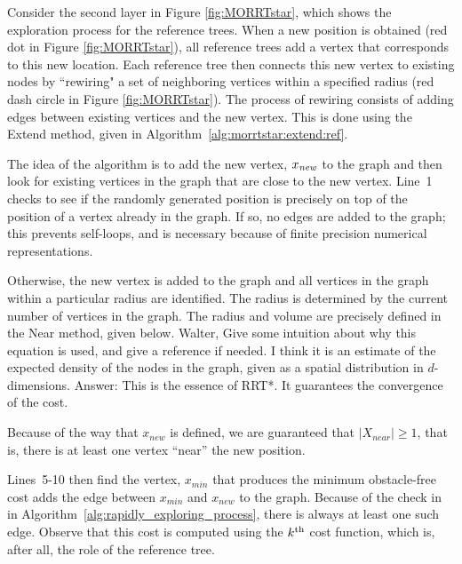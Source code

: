 \documentclass[conference]{IEEEtran}
\begin{document}

Consider the second layer in Figure \ref{fig:MORRTstar}, which shows the exploration process for the reference trees.
When a new position is obtained (red dot in Figure \ref{fig:MORRTstar}), all reference trees add a vertex that corresponds to this new location.  
Each reference tree then connects this new vertex to existing nodes by ``rewiring" a set of neighboring vertices within a specified radius (red dash circle in Figure \ref{fig:MORRTstar}).  
The process of rewiring consists of adding edges between existing vertices and the new vertex.  This is done using the {\sc Extend} method, given in Algorithm~\ref{alg:morrtstar:extend:ref}.

The idea of the algorithm is to add the new vertex, $x_{\it new}$ to the graph and then look for existing vertices in the graph that are close to the new vertex. 
Line~1 checks to see if the randomly generated position is precisely on top of the position of a vertex already in the graph.  
If so, no edges are added to the graph; this prevents self-loops, and is necessary because of finite precision numerical representations.  

Otherwise, the new vertex is added to the graph and all vertices in the graph within a particular radius are identified.  
The radius is determined by the current number of vertices in the graph. 
The radius and volume are precisely defined in the {\sc Near} method, given below. 
{\sc Walter, Give some intuition about why this equation is used, and give a reference if needed.  I think it is an estimate of the expected density of the nodes in the graph, given as a spatial distribution in $d$-dimensions.}  
{\sc Answer: This is the essence of RRT*. It guarantees the convergence of the cost.}


Because of the way that $x_{new}$ is defined, we are guaranteed that $|X_{near}| \geq 1$, that is, there is at least one vertex ``near'' the new position.

Lines~5-10 then find the vertex, $x_{min}$ that produces the minimum obstacle-free cost adds the edge between $x_{min}$ and $x_{new}$ to the graph.  
Because of the check in in Algorithm~\ref{alg:rapidly_exploring_process}, there is always at least one such edge.  
Observe that this cost is computed using the $k^{\rm th}$ cost function, which is, after all, the role of the reference tree.
\end{document}
